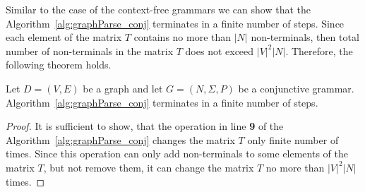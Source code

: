 Similar to the case of the context-free grammars we can show that the Algorithm~\ref{alg:graphParse_conj} terminates in a finite number of steps. Since each element of the matrix $T$ contains no more than $|N|$ non-terminals, then total number of non-terminals in the matrix $T$ does not exceed $|V|^2|N|$. Therefore, the following theorem holds.

\begin{mytheorem}\label{thm:finite_conj}
	Let $D = (V,E)$ be a graph and let $G =(N,\Sigma,P)$ be a conjunctive grammar. Algorithm~\ref{alg:graphParse_conj} terminates in a finite number of steps. 
\end{mytheorem}
\begin{proof}
	It is sufficient to show, that the operation in line \textbf{9} of the Algorithm~\ref{alg:graphParse_conj} changes the matrix $T$ only finite number of times. Since this operation can only add non-terminals to some elements of the matrix $T$, but not remove them, it can change the matrix $T$ no more than $|V|^2|N|$ times.
\end{proof}